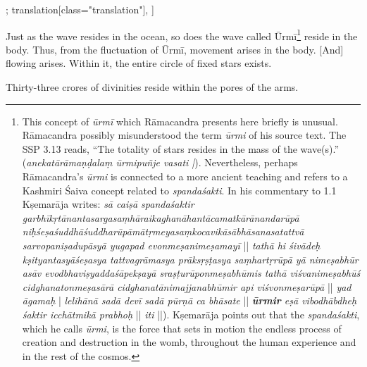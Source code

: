 \begin{alignment}[
  texts=edition[class="edition"];
  translation[class="translation"],
  ]
\begin{translation}
\begin{tlate}[p41_01]
Just as the wave resides in the ocean, so does the wave called Ūrmī\footnote{This concept of \textit{ūrmī} which Rāmacandra presents here briefly is unusual. Rāmacandra possibly misunderstood the term \textit{ūrmi} of his source text. The SSP 3.13 reads, ``The totality of stars resides in the mass of the wave(s).'' (\textit{anekatārāmaṇḍalaṃ ūrmipuñje vasati |}). Nevertheless, perhaps Rāmacandra's \textit{ūrmi} is connected to a more ancient teaching and refers to a Kashmiri Śaiva concept related to \textit{spandaśakti}. In his commentary to  1.1 Kṣemarāja writes: \textit{sā caiṣā spandaśaktir garbhīkṛtānantasargasaṃhāraikaghanāhantācamatkārānandarūpā niḥśeṣaśuddhāśuddharūpāmātṛmeyasaṃkocavikāsābhāsanasatattvā sarvopaniṣadupāsyā yugapad evonmeṣanimeṣamayī} || \textit{tathā hi śivādeḥ kṣityantasyāśeṣasya tattvagrāmasya prāksṛṣṭasya saṃhartṛrūpā yā nimeṣabhūr asāv evodbhaviṣyaddaśāpekṣayā sraṣṭurūponmeṣabhūmis tathā viśvanimeṣabhūś cidghanatonmeṣasārā cidghanatānimajjanabhūmir api viśvonmeṣarūpā} || \textit{yad āgamaḥ} | \textit{lelihānā sadā devī sadā pūrṇā ca bhāsate} || \textit{\textbf{ūrmir} eṣā vibodhābdheḥ śaktir icchātmikā prabhoḥ} || \textit{iti} ||). Kṣemarāja points out that the \textit{spandaśakti}, which he calls \textit{ūrmi}, is the force that sets in motion the endless process of creation and destruction in the womb, throughout the human experience and in the rest of the cosmos.} reside in the body. Thus, from the fluctuation of Ūrmī, movement arises in the body. [And] flowing arises. Within it, the entire circle of fixed stars exists.

Thirty-three crores of divinities reside within the pores of the arms.
\end{tlate}
  \end{translation}
\end{alignment}
\pagebreak %
